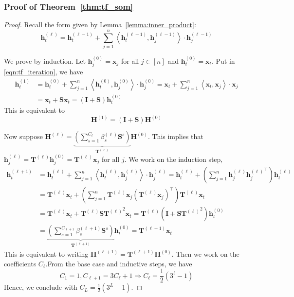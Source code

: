 \documentclass[11pt]{article}
\theoremstyle{plain}
\theoremstyle{definition}
\theoremstyle{remark}
\renewcommand{\^}[1]{^{(#1)}}
\newcommand{\bx}{\boldsymbol{x}}
\newcommand{\bh}{\boldsymbol{h}}
\newcommand{\bH}{\boldsymbol{H}}
\newcommand{\bI}{\boldsymbol{I}}
\newcommand{\bS}{\boldsymbol{S}}
\newcommand{\bT}{\boldsymbol{T}}
\newcommand{\inner}[1]{ \left\langle {#1} \right\rangle }
\begin{document}
\subsubsection{Proof of Theorem~\ref{thm:tf_som}}
\begin{proof}
Recall the form given by Lemma~\ref{lemma:inner_product}:
    \begin{equation}
        \bh_t^{(\ell)} = \bh_t^{(\ell-1)} + \sum_{j=1}^n \inner{\bh_t^{(\ell-1)}, \bh_j^{(\ell-1)}} \cdot \bh_j^{(\ell-1)}
    \label{eqn:tf_iteration}
    \end{equation}

We prove by induction. 
Let $\bh_j^{(0)} = \bx_j$ for all $j \in [n]$ and $\bh_t^{(0)} = \bx_t$. Put in \cref{eqn:tf_iteration}, we have
\begin{equation}
\begin{aligned}
    \bh_t^{(1)} &= \bh_t^{(0)} + \sum_{j=1}^n \inner{\bh_t^{(0)}, \bh_j^{(0)}} \cdot \bh_j^{(0)} = \bx_t +  \sum_{j=1}^n \inner{\bx_t, \bx_j} \cdot \bx_j \\
    &= \bx_t + \bS \bx_t = (\bI + \bS) \bh_t^{(0)}
\end{aligned}
\end{equation}
This is equivalent to 
\begin{equation}
    \bH^{(1)} = (\bI + \bS) \bH^{(0)}
\end{equation}

Now suppose $\displaystyle \bH^{(\ell)} = \underbrace{\left(\sum_{s=1}^{C_\ell} \beta_s^{(\ell)} \bS^s\right)}_{\bT^{(\ell)}}\bH^{(0)}$. This implies that 
$\bh_j^{(\ell)} = \bT^{(\ell)} \bh_j^{(0)} = \bT^{(\ell)} \bx_j$ for all $j$. We work on the induction step,
\begin{equation}
\begin{aligned}
    \bh_t^{(\ell+1)} &= \bh_t^{(\ell)} + \sum_{j=1}^n \inner{\bh_t^{(\ell)}, \bh_j^{(\ell)}} \cdot \bh_j^{(\ell)}  = \bh_t^{(\ell)} + \left(\sum_{j=1}^n  \bh_j^{(\ell)}  {\bh_j^{(\ell)}}^\top\right)  \bh_t^{(\ell)}  \\
    &= \bT^{(\ell)} \bx_t + \left(\sum_{j=1}^n  \bT^{(\ell)} \bx_j  \left(\bT^{(\ell)} \bx_j\right)^\top\right)  \bT^{(\ell)} \bx_t \\
    &= \bT^{(\ell)} \bx_t + \bT^{(\ell)} \bS {\bT^{(\ell)}}^2 \bx_t = \bT^{(\ell)} \left(\bI + \bS {\bT^{(\ell)}}^2 \right) \bh_t^{(0)} \\
    &= \underbrace{\left(\sum_{s=1}^{C_{\ell+1}} \beta_s^{(\ell+1)} \bS^s\right)}_{\bT^{(\ell+1)}} \bh_t^{(0)} = \bT^{(\ell+1)} \bx_t
\end{aligned}
\end{equation}
This is equivalent to writing
$ \bH^{(\ell+1)} = \bT^{(\ell+1)} \bH^{(0)}$. Then we work on the coefficients $C_\ell$.From the base case and inductive steps, we have
\begin{equation}
        C_1 = 1, C_{\ell+1} = 3 C_{\ell} + 1
    \Longrightarrow C_\ell =\frac{1}{2} \left(3^{\ell} - 1\right) 
\end{equation}
Hence, we conclude with $C_L = \frac{1}{2} \left(3^{L} - 1\right)$. 


\end{proof}
\end{document}
